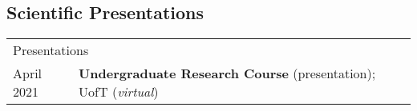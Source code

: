 \documentclass[10pt]{res} %
\begin{document}
\begin{resume}



\section{\Large Scientific Presentations}
\vspace{-5pt} %
\noindent\makebox[\linewidth]{\rule{\textwidth}{0.4pt}}
\vspace{-20pt} %

\begin{table}[h!]
\begin{tabularx}{\textwidth}{lX}
\multicolumn{2}{l}{ \rule{0pt}{3ex} \large \hspace{-12pt} Presentations \dotfill \rule[-1.2ex]{0pt}{0pt}} \\
April 2021 & \textbf{Undergraduate Research Course} (presentation); UofT (\textit{virtual})
\end{tabularx}

\end{table}




\end{resume}
\end{document}
